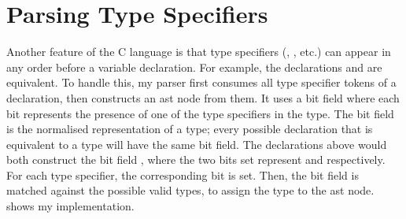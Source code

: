 \documentclass[../00-main.tex]{subfiles}
\begin{document}
\FloatBarrier %

\section{Parsing Type Specifiers}\label{app:sec:parsing type specifiers}

Another feature of the C language is that type specifiers (, , etc.) can appear in any order before a variable declaration.
For example, the declarations  and  are equivalent.
To handle this, my parser first consumes all type specifier tokens of a declaration, then constructs an  \gls{ast} node from them.
It uses a bit field where each bit represents the presence of one of the type specifiers in the type.
The bit field is the normalised representation of a type; every possible declaration that is equivalent to a type will have the same bit field.
The declarations above would both construct the bit field , where the two bits set represent  and  respectively.
For each type specifier, the corresponding bit is set.
Then, the bit field is matched against the possible valid types, to assign the type to the \gls{ast} node.
 shows my implementation.
\end{document}
